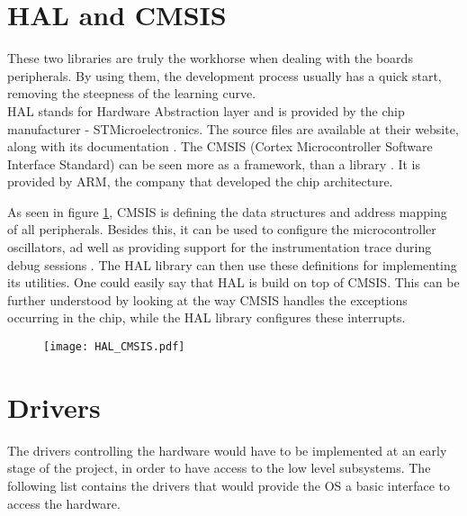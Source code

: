 \section{HAL and CMSIS}
These two libraries are truly the workhorse when dealing with the 
board\textquotesingle s peripherals. By using them, the development
process usually has a quick start, removing the steepness of the 
learning curve.	\\
HAL stands for Hardware Abstraction layer and is provided by the chip manufacturer - STMicroelectronics. The source files are available at
their website, along with its documentation \cite{HAL_library}.
The CMSIS (Cortex Microcontroller Software Interface Standard)
can be seen more as a framework, than a library
 \cite{CMSIS_core_library}. It is provided
by ARM, the company that developed the chip architecture.

As seen in figure \ref{fig:CMSIS_HAL}, CMSIS
is defining the data structures and address mapping of all peripherals.
Besides this, it can be used to configure the microcontroller
oscillators, ad well as providing support for the instrumentation trace during debug sessions \cite{cmsis_reference}.
The HAL library can then use these definitions for implementing its
utilities. One could easily say that HAL is build on top of CMSIS.
This can be further understood by looking at the way CMSIS handles
the exceptions occurring in the chip, while the HAL library configures
these interrupts.

 
\begin{figure}[H]
\centering
\texttt{[image: HAL\_CMSIS.pdf]}
\label{fig:CMSIS_HAL}
\end{figure}

\section{Drivers}

The drivers controlling the hardware would have to be implemented at an 
early stage of the project, in order to have access to the low level
subsystems.
The following list contains the drivers that would provide the OS a basic
interface to access the hardware.

